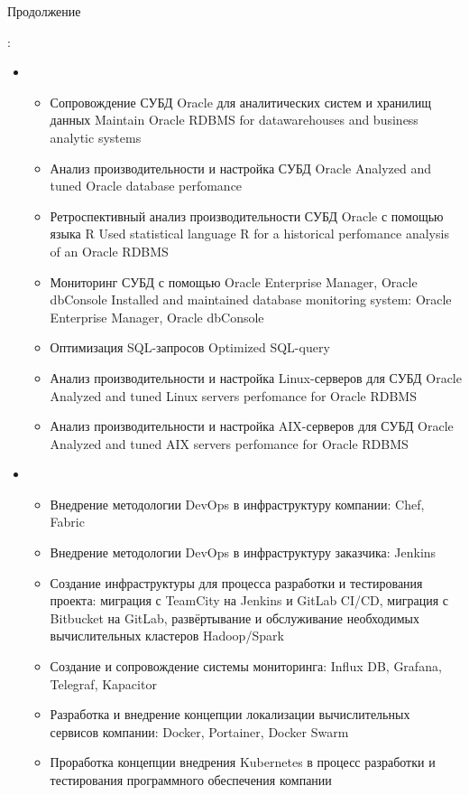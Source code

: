 \documentclass[11pt,a4paper,sans]{moderncv}        %
\begin{document}
{\protect{}}
{Продолжение}
{}
{
	\achievements:
	\begin{itemize}
		\item {}
		\begin{itemize}
			\item {}
				{Сопровождение СУБД Oracle для аналитических систем и хранилищ данных}
				{Maintain Oracle RDBMS for datawarehouses and business analytic systems}
			\item {}
				{Анализ производительности и настройка СУБД Oracle}
				{Analyzed and tuned Oracle database perfomance}
			\item {}
				{Ретроспективный анализ производительности СУБД Oracle с помощью языка R}
				{Used statistical language R for a historical perfomance analysis of an Oracle RDBMS}
			\item {}
				{Мониторинг СУБД с помощью Oracle Enterprise Manager, Oracle dbConsole}
				{Installed and maintained database monitoring system: Oracle Enterprise Manager, Oracle dbConsole}
			\item {}
				{Оптимизация SQL-запросов}
				{Optimized SQL-query}
			\item {}
				{Анализ производительности и настройка Linux-серверов для СУБД Oracle}
				{Analyzed and tuned Linux servers perfomance for Oracle RDBMS}
			\item {}
				{Анализ производительности и настройка AIX-серверов для СУБД Oracle}
				{Analyzed and tuned AIX servers perfomance for Oracle RDBMS}
		\end{itemize}
		\item {}
		\begin{itemize}
			\item {}
			{Внедрение методологии DevOps в инфраструктуру компании: Chef, Fabric}
			{}
			\item {}
			{Внедрение методологии DevOps в инфраструктуру заказчика: Jenkins}
			{}
			\item {}
			{Создание инфраструктуры для процесса разработки и тестирования проекта: миграция с TeamCity на Jenkins и GitLab CI/CD, миграция с Bitbucket на GitLab, развёртывание и обслуживание необходимых вычислительных кластеров Hadoop/Spark}
			{}			
			\item {}
			{Создание и сопровождение системы мониторинга: Influx DB, Grafana, Telegraf, Kapacitor}
			{}
			\item {}
			{Разработка и внедрение концепции локализации вычислительных сервисов компании: Docker, Portainer, Docker Swarm}
			{}
			\item {}
			{Проработка концепции внедрения Kubernetes в процесс разработки и тестирования программного обеспечения компании}
			{}
		\end{itemize}
	\end{itemize}
}
\end{document}
